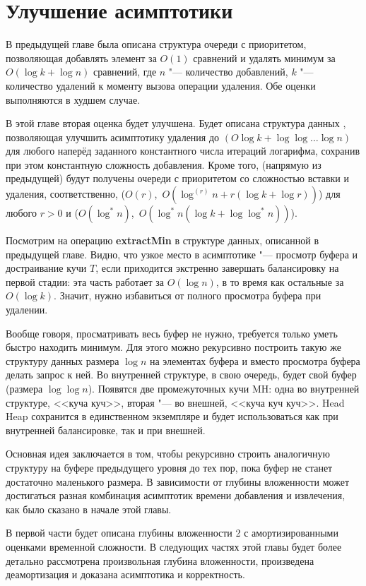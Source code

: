 \chapter{Улучшение асимптотики} \label{chapt-ch}

В предыдущей главе была описана структура очереди с приоритетом, позволяющая
добавлять элемент за $O(1)$ сравнений и удалять минимум за $O(\log k + \log n)$
сравнений, где $n$ "--- количество добавлений, $k$ "--- количество удалений
к моменту вызова операции удаления. Обе оценки выполняются в худшем случае.

В этой главе вторая оценка будет улучшена.  Будет описана структура данных \CH,
позволяющая улучшить асимптотику удаления до $(O\log k + \log \log \dots \log n)$
для любого наперёд заданного константного числа итераций логарифма, сохранив при
этом константную сложность добавления. Кроме того, (напрямую из предыдущей)
будут получены очереди с приоритетом со сложностью вставки и удаления,
соответственно, ($O(r)$,~$O(\log^{(r)} n + r (\log k + \log r))$) для
любого $r > 0$ и ($O(\log^* n)$,~$O(\log^* n(\log k + \log \log^* n))$).

Посмотрим на операцию \textbf{extractMin} в структуре данных, описанной в предыдущей
главе. Видно, что узкое место в асимптотике "--- просмотр буфера и достраивание
кучи $T$, если приходится экстренно завершать балансировку на первой стадии:
эта часть работает за $O(\log n)$, в то время как остальные за $O(\log k)$.
Значит, нужно избавиться от полного просмотра буфера при удалении.

Вообще говоря, просматривать весь буфер не нужно, требуется только уметь быстро
находить минимум. Для этого можно рекурсивно построить такую же структуру данных
размера $\log n$ на элементах буфера и вместо просмотра буфера делать запрос к ней.
Во внутренней структуре, в свою очередь, будет свой буфер (размера $\log \log n$).
Появятся две промежуточных кучи MH: одна во внутренней структуре, <<куча куч>>,
вторая "--- во внешней, <<куча куч куч>>. Head Heap сохранится в единственном
экземпляре и будет использоваться как при внутренней балансировке, так и при внешней.

Основная идея \CH заключается в том, чтобы рекурсивно строить аналогичную
структуру на буфере предыдущего уровня до тех пор, пока буфер не станет достаточно
маленького размера. В зависимости от глубины вложенности может достигаться
разная комбинация асимптотик времени добавления и извлечения, как было сказано
в начале этой главы.

В первой части будет описана \CH глубины вложенности 2 с амортизированными оценками
временной сложности. В следующих частях этой главы будет более детально рассмотрена
произвольная глубина вложенности, произведена деамортизация и доказана асимптотика
и корректность.

